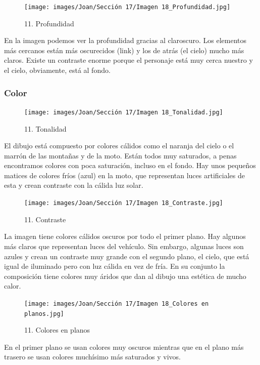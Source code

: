 \documentclass[12pt]{article}
\begin{document}
    \begin{figure}[H]
          \centering
          \texttt{[image: images/Joan/Sección 17/Imagen 18\_Profundidad.jpg]}
          \caption{\small 11. Profundidad}
        \end{figure}

        En la imagen podemos ver la profundidad gracias al claroscuro. Los elementos más cercanos están más oscurecidos (link) y los de atrás (el cielo) mucho más claros. 
    Existe un contraste enorme porque el personaje está muy cerca nuestro y el cielo, obviamente, está al fondo. 

            \subsubsection{Color}
    \begin{figure}[H]
          \centering
          \texttt{[image: images/Joan/Sección 17/Imagen 18\_Tonalidad.jpg]}
          \caption{\small 11. Tonalidad}
        \end{figure}

            El dibujo está compuesto por colores cálidos como el naranja del cielo o el marrón de las montañas y de la moto. Están todos muy saturados, a penas encontramos colores con poca saturación, incluso en el fondo. 
    Hay unos pequeños matices de colores fríos (azul) en la moto, que representan luces artificiales de esta y crean contraste con la cálida luz solar. 

            \begin{figure}[H]
          \centering
          \texttt{[image: images/Joan/Sección 17/Imagen 18\_Contraste.jpg]}
          \caption{\small 11. Contraste}
        \end{figure}
        La imagen tiene colores cálidos oscuros por todo el primer plano. Hay algunos más claros que representan luces del vehículo. Sin embargo, algunas luces son azules y crean un contraste muy grande con el segundo plano, el cielo, que está igual de iluminado pero con luz cálida en vez de fría. 
    En su conjunto la composición tiene colores muy áridos que dan al dibujo una estética de mucho calor. 

        \begin{figure}[H]
          \centering
          \texttt{[image: images/Joan/Sección 17/Imagen 18\_Colores en planos.jpg]}
          \caption{\small 11. Colores en planos}
        \end{figure}

        En el primer plano se usan colores muy oscuros mientras que en el plano más trasero se usan colores muchísimo más saturados y vivos. 

        
\end{document}
